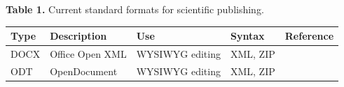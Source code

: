 \documentclass[10pt,fleqn]{wlpeerj}
\begin{document}
\textbf{Table
1.}
Current
standard
formats
for
scientific
publishing.

\begin{longtable}[]{@{}lllll@{}}
\toprule
\begin{minipage}[b]{0.06\columnwidth}\raggedright\strut
\textbf{Type}
\strut\end{minipage}
&
\begin{minipage}[b]{0.15\columnwidth}\raggedright\strut
\textbf{Description}
\strut\end{minipage}
&
\begin{minipage}[b]{0.13\columnwidth}\raggedright\strut
\textbf{Use}
\strut\end{minipage}
&
\begin{minipage}[b]{0.10\columnwidth}\raggedright\strut
\textbf{Syntax}
\strut\end{minipage}
&
\begin{minipage}[b]{0.41\columnwidth}\raggedright\strut
\textbf{Reference}
\strut\end{minipage}\tabularnewline
\midrule
\endhead
\begin{minipage}[t]{0.06\columnwidth}\raggedright\strut
DOCX
\strut\end{minipage}
&
\begin{minipage}[t]{0.15\columnwidth}\raggedright\strut
Office
Open
XML
\strut\end{minipage}
&
\begin{minipage}[t]{0.13\columnwidth}\raggedright\strut
WYSIWYG
editing
\strut\end{minipage}
&
\begin{minipage}[t]{0.10\columnwidth}\raggedright\strut
XML,
ZIP
\strut\end{minipage}
&
\begin{minipage}[t]{0.41\columnwidth}\raggedright\strut
\citep{OOXML}
\strut\end{minipage}\tabularnewline
\begin{minipage}[t]{0.06\columnwidth}\raggedright\strut
ODT
\strut\end{minipage}
&
\begin{minipage}[t]{0.15\columnwidth}\raggedright\strut
OpenDocument
\strut\end{minipage}
&
\begin{minipage}[t]{0.13\columnwidth}\raggedright\strut
WYSIWYG
editing
\strut\end{minipage}
&
\begin{minipage}[t]{0.10\columnwidth}\raggedright\strut
XML,
ZIP
\strut\end{minipage}

\end{longtable}
\end{document}
